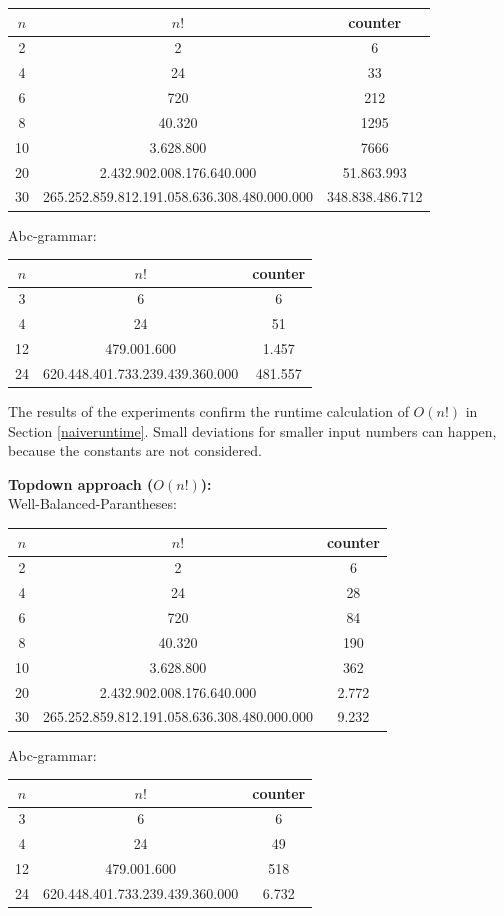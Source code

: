 \documentclass[a4paper, 11pt]{article}
\begin{document}
\begin{tabular}{|c|c|c|}
\hline
$n$ & $n!$ & counter \\
\hline
2& 2 & 6\\
4& 24 & 33\\
6& 720 & 212\\
8& 40.320 & 1295\\
10& 3.628.800 &7666 \\
20& 2.432.902.008.176.640.000 & 51.863.993\\
30& 265.252.859.812.191.058.636.308.480.000.000 & 348.838.486.712\\
\hline
\end{tabular}

Abc-grammar: 

\begin{tabular}{|c|c|c|}
\hline
$n$ & $n!$ & counter \\
\hline
3& 6 & 6\\
4& 24 & 51\\
12& 479.001.600 & 1.457\\
24& 620.448.401.733.239.439.360.000 & 481.557\\
\hline
\end{tabular}

The results of the experiments confirm the runtime calculation of $O(n!)$ in Section \ref{naiveruntime}. Small deviations for smaller input numbers can happen, because the constants are not considered.



\textbf{Topdown approach ($O(n!)$):} \\
Well-Balanced-Parantheses: 

\begin{tabular}{|c|c|c|}
\hline
$n$ & $n!$ & counter \\
\hline
2& 2 & 6\\
4& 24 & 28\\
6& 720 & 84\\
8& 40.320 & 190\\
10& 3.628.800 & 362 \\
20& 2.432.902.008.176.640.000 & 2.772\\
30& 265.252.859.812.191.058.636.308.480.000.000 & 9.232\\
\hline
\end{tabular}

Abc-grammar: 

\begin{tabular}{|c|c|c|}
\hline
$n$ & $n!$ & counter \\
\hline
3& 6 & 6\\
4& 24 & 49\\
12& 479.001.600 & 518\\
24& 620.448.401.733.239.439.360.000 & 6.732\\
\hline
\end{tabular}
\end{document}
